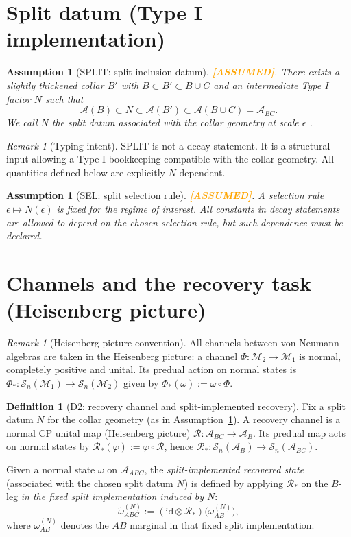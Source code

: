 \documentclass[11pt]{article}
\newtheorem{assumption}[theorem]{Assumption}
\theoremstyle{definition}
\newtheorem{definition}[theorem]{Definition}
\theoremstyle{remark}
\newtheorem{remark}[theorem]{Remark}
\newcommand{\ASSUMED}{\textcolor{orange}{\textbf{[ASSUMED]}}}
\newcommand{\cA}{\mathcal{A}}
\newcommand{\cM}{\mathcal{M}}
\newcommand{\cR}{\mathcal{R}}
\newcommand{\Sn}{\mathcal{S}_n}
\begin{document}
\section{Split datum (Type I implementation)}

\begin{assumption}[SPLIT: split inclusion datum]
\label{ass:split}
\ASSUMED. There exists a slightly thickened collar $B'$ with $B \subset
B' \subset B \cup C$ and an intermediate Type I factor $N$ such that
\[
\cA(B) \subset N \subset \cA(B') \subset \cA(B \cup C) = \cA_{BC}.
\]
We call $N$ the \emph{split datum} associated with the collar geometry
at scale $\epsilon$ \cite{DL}.
\end{assumption}

\begin{remark}[Typing intent]
\label{rem:typing}
SPLIT is not a decay statement. It is a structural input allowing a Type
I bookkeeping compatible with the collar geometry. All quantities
defined below are explicitly $N$-dependent.
\end{remark}

\begin{assumption}[SEL: split selection rule]
\label{ass:sel}
\ASSUMED. A selection rule $\epsilon \mapsto N(\epsilon)$ is fixed for
the regime of interest. All constants in decay statements are allowed to
depend on the chosen selection rule, but such dependence must be
declared.
\end{assumption}

\section{Channels and the recovery task (Heisenberg picture)}

\begin{remark}[Heisenberg picture convention]
\label{rem:heisenberg}
All channels between von Neumann algebras are taken in the Heisenberg
picture: a channel $\Phi: \cM_2 \to \cM_1$ is normal, completely
positive and unital. Its predual action on normal states is $\Phi_*:
\Sn(\cM_1) \to \Sn(\cM_2)$ given by $\Phi_*(\omega) := \omega \circ
\Phi$.
\end{remark}

\begin{definition}[D2: recovery channel and split-implemented recovery]
\label{def:recovery}
Fix a split datum $N$ for the collar geometry (as in
Assumption~\ref{ass:split}). A recovery channel is a normal CP unital
map (Heisenberg picture) $\cR: \cA_{BC} \to \cA_B$. Its predual map acts
on normal states by $\cR_*(\varphi) := \varphi \circ \cR$, hence $\cR_*:
\Sn(\cA_B) \to \Sn(\cA_{BC})$.

Given a normal state $\omega$ on $\cA_{ABC}$, the
\emph{split-implemented recovered state} (associated with the chosen
split datum $N$) is defined by applying $\cR_*$ on the $B$-leg \emph{in
the fixed split implementation induced by $N$}:
\[
\widetilde{\omega}^{(N)}_{ABC} := (\mathrm{id} \otimes \cR_*)\bigl(
\omega^{(N)}_{AB}\bigr),
\]
where $\omega^{(N)}_{AB}$ denotes the $AB$ marginal in that fixed split
implementation.
\end{definition}
\end{document}
